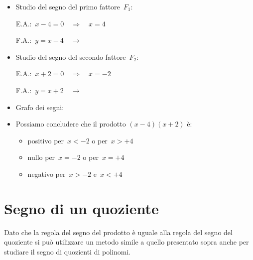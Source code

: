 \begin{esempio}
\begin{itemize} [noitemsep]
 \item Studio del segno del primo fattore~$F_1$:\\
 \begin{minipage}{.45\textwidth}
  E.A.:~$x - 4 = 0 \quad \Rightarrow \quad x = 4$
 \end{minipage}
 \begin{minipage}{.25\textwidth}
  F.A.:~$y = x - 4 \quad \rightarrow$
 \end{minipage}
 \begin{minipage}{.3\textwidth}
  
 \end{minipage}
 \item Studio del segno del secondo fattore~$F_2$:\\
 \begin{minipage}{.45\textwidth}
  E.A.:~$x + 2 = 0 \quad \Rightarrow \quad x=-2$
 \end{minipage}
 \begin{minipage}{.25\textwidth}
  F.A.:~$y = x + 2 \quad \rightarrow$
 \end{minipage}
 \begin{minipage}{.3\textwidth}
  
 \end{minipage}
 \item Grafo dei segni:
 
 \item Possiamo concludere che il prodotto $(x -4)(x +2)$ è:
\begin{itemize} [noitemsep]
 \item positivo per~$x < -2$ o per~$x > +4$
 \item nullo per~$x = -2$ o per~$x = +4$
 \item negativo per~$x > -2$ e~$x < +4$
\end{itemize}
\end{itemize}

 \end{esempio}

\section{Segno di un quoziente}
\label{sec:dis_quoziente}

Dato che la regola del segno del prodotto è uguale alla regola del segno del 
quoziente si può utilizzare un metodo simile a quello presentato sopra anche 
per studiare il segno di quozienti di polinomi.

